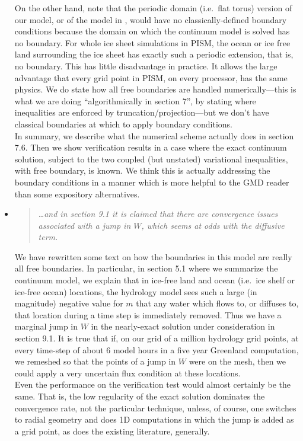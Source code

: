\documentclass[11pt,reqno]{amsart}
\newcommand{\reply}[2]{
\medskip\medskip
\item  \begin{quote}
\emph{#1}
\end{quote}

\medskip
\noindent #2}
\begin{document}
\begin{itemize}
{\indent On the other hand, note that the periodic domain (i.e.~flat torus) version of our model, or of the model in \cite{Schoofetal2012}, would have no classically-defined boundary conditions because the domain on which the continuum model is solved has no boundary.  For whole ice sheet simulations in PISM, the ocean or ice free land surrounding the ice sheet has exactly such a periodic extension, that is, no boundary.  This has little disadvantage in practice.  It allows the large advantage that every grid point in PISM, on every processor, has the same physics.  We do state how all free boundaries are handled numerically---this is what we are doing ``algorithmically in section 7'', by stating where inequalities are enforced by truncation/projection---but we don't have classical boundaries at which to apply boundary conditions. \\
\indent In summary, we describe what the numerical scheme actually does in section 7.6.  Then we show verification results in a case where the exact continuum solution, subject to the two coupled (but unstated) variational inequalities, with free boundary, is known.  We think this is actually addressing the boundary conditions in a manner which is more helpful to the GMD reader than some expository alternatives.}

\reply{\dots and in section 9.1 it is claimed that there are convergence issues associated with a jump in $W$, which seems at odds with the diffusive term.}
{We have rewritten some text on how the boundaries in this model are really all free boundaries.  In particular, in section 5.1 where we summarize the continuum model, we explain that in ice-free land and ocean (i.e.~ice shelf or ice-free ocean) locations, the hydrology model sees such a large (in magnitude) negative value for $m$ that any water which flows to, or diffuses to, that location during a time step is immediately removed.  Thus we have a marginal jump in $W$ in the nearly-exact solution under consideration in section 9.1.  It is true that if, on our grid of a million hydrology grid points, at every time-step of about 6 model hours in a five year Greenland computation, we remeshed so that the points of a jump in $W$ were on the mesh, then we could apply a very uncertain flux condition at these locations. \\
\indent Even the performance on the verification test would almost certainly be the same.  That is, the low regularity of the exact solution dominates the convergence rate, not the particular technique, unless, of course, one switches to radial geometry and does 1D computations in which the jump is added as a grid point, as does the existing literature, generally.}


\end{itemize}
\end{document}
